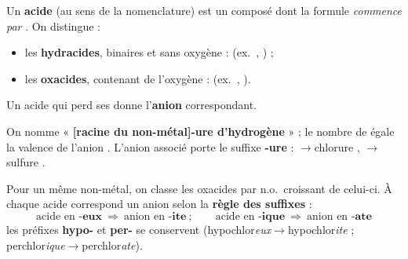 \documentclass[11pt,a4paper]{article}
\begin{document}

\begin{cle}
Un \textbf{acide} (au sens de la nomenclature) est un composé dont la formule \emph{commence par }.
On distingue :
\begin{itemize}[leftmargin=1.5em,topsep=2pt,itemsep=1pt]
  \item les \textbf{hydracides}, binaires et sans oxygène :  (ex.\ , ) ;
  \item les \textbf{oxacides}, contenant de l'oxygène :  (ex.\ , ).
\end{itemize}
Un acide qui perd ses  donne l'\textbf{anion} correspondant.
\end{cle}

\begin{methode}
On nomme  « \textbf{[racine du non-métal]-ure d'hydrogène} » ; le nombre de  égale la valence
de l'anion . L'anion associé porte le suffixe \textbf{-ure} : $\to$chlorure ,
$\to$sulfure .
\end{methode}

\begin{methode}
Pour un même non-métal, on classe les oxacides par n.o.\ croissant de celui-ci. À chaque acide correspond un
anion selon la \textbf{règle des suffixes} :
\[ \boxed{\ \text{acide en }\textbf{-eux}\ \Rightarrow\ \text{anion en }\textbf{-ite}\ ;\qquad
          \text{acide en }\textbf{-ique}\ \Rightarrow\ \text{anion en }\textbf{-ate}\ } \]
les préfixes \textbf{hypo-} et \textbf{per-} se conservent (hypochlor\emph{eux}$\to$hypochlor\emph{ite} ;
perchlor\emph{ique}$\to$perchlor\emph{ate}).
\end{methode}

\begin{center}
\end{center}
\end{document}

